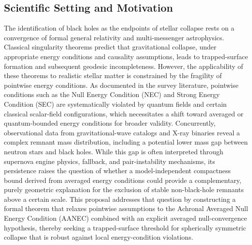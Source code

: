 \documentclass[conference]{IEEEtran}
\begin{document}
\subsection{Scientific Setting and Motivation}
The identification of black holes as the endpoints of stellar collapse rests on a convergence of formal general relativity and multi-messenger astrophysics. Classical singularity theorems predict that gravitational collapse, under appropriate energy conditions and causality assumptions, leads to trapped-surface formation and subsequent geodesic incompleteness. However, the applicability of these theorems to realistic stellar matter is constrained by the fragility of pointwise energy conditions. As documented in the survey literature, pointwise conditions such as the Null Energy Condition (NEC) and Strong Energy Condition (SEC) are systematically violated by quantum fields and certain classical scalar-field configurations, which necessitates a shift toward averaged or quantum-bounded energy conditions for broader validity. Concurrently, observational data from gravitational-wave catalogs and X-ray binaries reveal a complex remnant mass distribution, including a potential lower mass gap between neutron stars and black holes. While this gap is often interpreted through supernova engine physics, fallback, and pair-instability mechanisms, its persistence raises the question of whether a model-independent compactness bound derived from averaged energy conditions could provide a complementary, purely geometric explanation for the exclusion of stable non-black-hole remnants above a certain scale. This proposal addresses that question by constructing a formal theorem that relaxes pointwise assumptions to the Achronal Averaged Null Energy Condition (AANEC) combined with an explicit averaged null-convergence hypothesis, thereby seeking a trapped-surface threshold for spherically symmetric collapse that is robust against local energy-condition violations.~\cite{cite_0ed84243cf171bc4}
\end{document}
